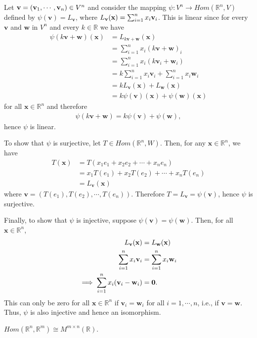 \documentclass[12pt,letterpaper,reqno]{article}
\numberwithin{equation}{section}
\newcommand{\bv}{\mathbf{v}}
\newcommand{\bw}{\mathbf{w}}
\newcommand{\bx}{\mathbf{x}}
\begin{document}
\begin{pf}
	Let ${\bf v}=(\bv_1,\cdots,\bv_n) \in V^n$  and consider the mapping $\psi:V^n \to Hom(\mathbb{R}^n,V)$ defined by $\psi(\bv)=L_{\bv}$, where $L_{\bv}({\bf x})=\sum_{i=1}^nx_i\bv_i$. This is linear since for every $\bv$ and $\bw$ in $V^n$ and every $k \in \mathbb{R}$ we have 
	\begin{align*}
		\psi(k\bv+\bw)(\bx)&=L_{k\bv+\bw}(\bx) \\
		&=\sum_{i=1}^nx_i(k\bv+\bw)_i \\
		&=\sum_{i=1}^nx_i(k\bv_i+\bw_i) \\
		&=k\sum_{i=1}^nx_i\bv_i+\sum_{i=1}^nx_i\bw_i \\
		&=kL_{\bv}(\bx)+L_{\bw}(\bx) \\
		&=k\psi(\bv)(\bx)+\psi(\bw)(\bx)
	\end{align*}
for all $\bx \in \mathbb{R}^n$ and therefore
\begin{align*}
	\psi(k\bv+\bw)=k\psi(\bv)+\psi(\bw),
\end{align*}
hence $\psi$ is linear. 

To show that $\psi$ is surjective, let $T \in Hom(\mathbb{R}^n,W)$. Then, for any $\bx \in \mathbb{R}^n$, we have 
\begin{align*}
	T(\bx)&=T(x_1e_1+x_2e_2+\cdots+x_ne_n) \\
	&=x_1T(e_1)+x_2T(e_2)+\cdots+x_nT(e_n) \\
	&=L_{\bv}(\bx) 
\end{align*} 
where $\bv=(T(e_1), T(e_2), \cdots, T(e_n))$. Therefore $T=L_{\bv}=\psi(\bv)$, hence $\psi$ is surjective.

Finally, to show that $\psi$ is injective, suppose $\psi(\bv)=\psi(\bw)$. Then, for all $\bx \in \mathbb{R}^n$,
\begin{align*}
	L_{\bv}(\bx)&=L_{\bw}(\bx) \\
	\sum_{i=1}^nx_i \bv_i &= \sum_{i=1}^nx_i\bw_i \\
	\implies \sum_{i=1}^nx_i(\bv_i-\bw_i)&={\bf 0}.  \\
\end{align*}
This can only be zero for all $\bx \in \mathbb{R}^n$ if $\bv_i=\bw_i$ for all $i=1,\cdots,n$, i.e., if $\bv=\bw$. Thus, $\psi$ is also injective and hence an isomorphism.
\end{pf}

\begin{prop}\label{prop:r_n_to_r_m_rep_by_matrix}
	$Hom(\mathbb{R}^n,\mathbb{R}^m) \cong M^{m \times n}(\mathbb{R})$.
\end{prop} 
\end{document}
